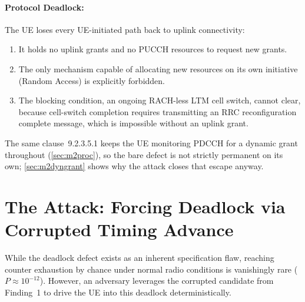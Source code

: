 \paragraph{Protocol Deadlock:} The UE loses every UE-initiated path back to uplink connectivity:
\begin{enumerate}\itemsep1pt
  \item It holds no uplink grants and no PUCCH resources to request new grants.
  \item The only mechanism capable of allocating new resources on its own initiative (Random Access) is
        explicitly forbidden.
  \item The blocking condition, an ongoing RACH-less LTM cell switch, cannot clear, because cell-switch
        completion requires transmitting an RRC reconfiguration complete message, which is impossible
        without an uplink grant.
\end{enumerate}
The same clause~9.2.3.5.1 keeps the UE monitoring PDCCH for a dynamic grant throughout
(\cref{sec:m2proc}), so the bare defect is not strictly permanent on its own; \cref{sec:m2dyngrant} shows
why the attack closes that escape anyway.

\section{The Attack: Forcing Deadlock via Corrupted Timing Advance}
\label{sec:m2threat}

While the deadlock defect exists as an inherent specification flaw, reaching counter exhaustion by chance
under normal radio conditions is vanishingly rare ($P \approx 10^{-12}$). However, an adversary leverages
the corrupted candidate \TA{} from Finding~1 to drive the UE into this deadlock deterministically.

